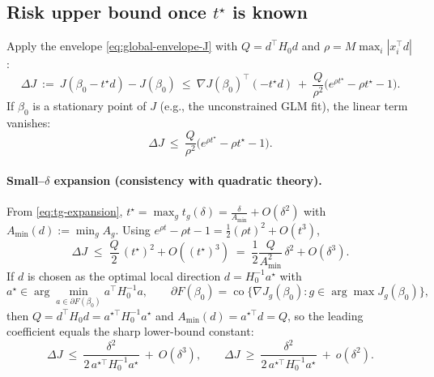 \documentclass[11pt]{article}
\theoremstyle{plain}
\theoremstyle{definition}
\newcommand{\1}{\mathbf{1}}
\begin{document}
\subsection{Risk upper bound once \texorpdfstring{$t^\star$}{t*} is known}
Apply the envelope \eqref{eq:global-envelope-J} with $Q=d^\top H_0 d$ and $\rho=M\max_i |x_i^\top d|$:
\begin{equation}
\label{eq:DeltaJ-UB}
\Delta J\ :=\ J(\beta_0-t^\star d)-J(\beta_0)
\ \le\ \nabla J(\beta_0)^\top (-t^\star d)\ +\ \frac{Q}{\rho^2}\Big(e^{\rho t^\star}-\rho t^\star - 1\Big).
\end{equation}
If $\beta_0$ is a stationary point of $J$ (e.g., the unconstrained GLM fit), the linear term vanishes:
\begin{equation}
\label{eq:DeltaJ-UB-stationary}
\boxed{\quad
\Delta J\ \le\ \frac{Q}{\rho^2}\Big(e^{\rho t^\star}-\rho t^\star - 1\Big).
\quad}
\end{equation}

\paragraph{Small–$\delta$ expansion (consistency with quadratic theory).}
From \eqref{eq:tg-expansion}, $t^\star=\max_g t_g(\delta)=\frac{\delta}{A_{\min}}+O(\delta^2)$ with
$A_{\min}(d):=\min_g A_g$. Using $e^{\rho t}-\rho t-1=\tfrac12(\rho t)^2+O(t^3)$,
\[
\Delta J \;\le\; \frac{Q}{2}\,(t^\star)^2 + O((t^\star)^3)
\;=\; \frac{1}{2}\frac{Q}{A_{\min}^2}\,\delta^2 + O(\delta^3).
\]
If $d$ is chosen as the optimal local direction $d=H_0^{-1}a^\star$ with
\[
a^\star \in \arg\min_{a\in\partial F(\beta_0)} a^\top H_0^{-1} a,\qquad
\partial F(\beta_0)=\operatorname{co}\{\nabla J_g(\beta_0): g\in\arg\max J_g(\beta_0)\},
\]
then $Q=d^\top H_0 d=a^{\star\top}H_0^{-1}a^\star$ and $A_{\min}(d)=a^{\star\top}d=Q$,
so the leading coefficient equals the sharp lower-bound constant:
\[
\Delta J\ \le\ \frac{\delta^2}{2\,a^{\star\top}H_0^{-1}a^\star}\ +\ O(\delta^3),
\qquad
\Delta J\ \ge\ \frac{\delta^2}{2\,a^{\star\top}H_0^{-1}a^\star}\ +\ o(\delta^2).
\]
\end{document}

